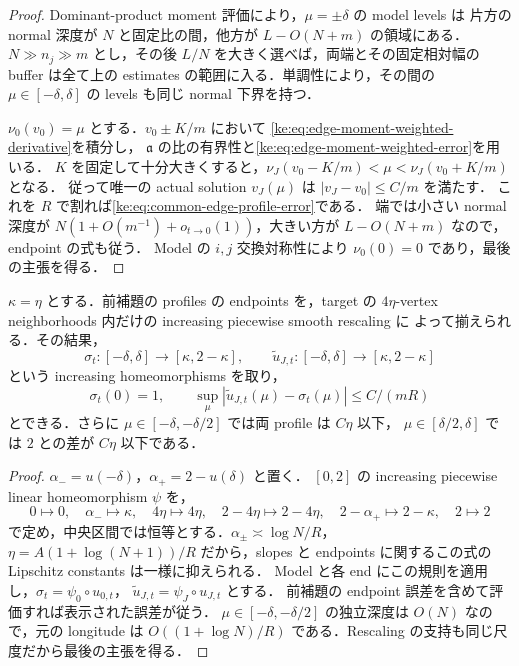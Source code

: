 \begin{proof}
Dominant-product moment 評価により，$\mu=\pm\delta$ の model levels は
片方の normal 深度が $N$ と固定比の間，他方が $L-O(N+m)$ の領域にある．
$N\gg n_j\gg m$ とし，その後 $L/N$ を大きく選べば，両端とその固定相対幅の
buffer は全て上の estimates の範囲に入る．単調性により，その間の
$\mu\in[-\delta,\delta]$ の levels も同じ normal 下界を持つ．

$\nu_0(v_0)=\mu$ とする．$v_0\pm K/m$ において
\eqref{ke:eq:edge-moment-weighted-derivative}を積分し，
$\mathfrak a$ の比の有界性と\eqref{ke:eq:edge-moment-weighted-error}を用いる．
$K$ を固定して十分大きくすると，$\nu_J(v_0-K/m)<\mu<\nu_J(v_0+K/m)$ となる．
従って唯一の actual solution $v_J(\mu)$ は $|v_J-v_0|\le C/m$ を満たす．
これを $R$ で割れば\eqref{ke:eq:common-edge-profile-error}である．
端では小さい normal 深度が $N(1+O(m^{-1})+o_{t\to0}(1))$，大きい方が
$L-O(N+m)$ なので，endpoint の式も従う．
Model の $i,j$ 交換対称性により $\nu_0(0)=0$ であり，最後の主張を得る．
\end{proof}

\begin{corollary}
\label{ke:common-neck-longitude}
$\kappa=\eta$ とする．前補題の profiles の endpoints を，target の
$4\eta$-vertex neighborhoods 内だけの increasing piecewise smooth rescaling に
よって揃えられる．その結果，
\[
 \sigma_t:[-\delta,\delta]\longrightarrow[\kappa,2-\kappa],\qquad
 \widetilde u_{J,t}:[-\delta,\delta]\longrightarrow[\kappa,2-\kappa]
\]
という increasing homeomorphisms を取り，
\[
 \sigma_t(0)=1,\qquad
 \sup_\mu|\widetilde u_{J,t}(\mu)-\sigma_t(\mu)|\le C/(mR)
\]
とできる．さらに $\mu\in[-\delta,-\delta/2]$ では両 profile は $C\eta$ 以下，
$\mu\in[\delta/2,\delta]$ では $2$ との差が $C\eta$ 以下である．
\end{corollary}

\begin{proof}
$\alpha_-=u(-\delta)$，$\alpha_+=2-u(\delta)$ と置く．
$[0,2]$ の increasing piecewise linear homeomorphism $\psi$ を，
\[
 0\mapsto0,\quad\alpha_-\mapsto\kappa,\quad
 4\eta\mapsto4\eta,\quad2-4\eta\mapsto2-4\eta,
 \quad2-\alpha_+\mapsto2-\kappa,\quad2\mapsto2
\]
で定め，中央区間では恒等とする．$\alpha_\pm\asymp\log N/R$，
$\eta=A(1+\log(N+1))/R$ だから，slopes と endpoints に関するこの式の
Lipschitz constants は一様に抑えられる．
Model と各 end にこの規則を適用し，$\sigma_t=\psi_0\circ u_{0,t}$，
$\widetilde u_{J,t}=\psi_J\circ u_{J,t}$ とする．
前補題の endpoint 誤差を含めて評価すれば表示された誤差が従う．
$\mu\in[-\delta,-\delta/2]$ の独立深度は $O(N)$ なので，元の longitude は
$O((1+\log N)/R)$ である．Rescaling の支持も同じ尺度だから最後の主張を得る．
\end{proof}


